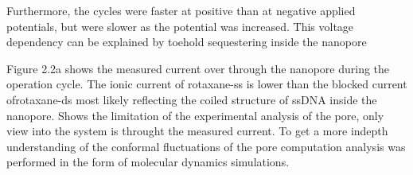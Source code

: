 Furthermore, the cycles were faster at positive than at negative applied potentials, but
were slower as the potential was increased. This voltage dependency can be explained by
toehold sequestering inside the nanopore


Figure 2.2a shows the measured current over through the nanopore during the operation
cycle. The ionic current of rotaxane-ss is lower than the blocked current ofrotaxane-ds
most likely reflecting the coiled structure of ssDNA inside the nanopore. Shows the
limitation of the experimental analysis of the pore, only view into the system is
throught the measured current. To get a more indepth understanding of the conformal
fluctuations of the pore computation analysis was performed in the form of molecular
dynamics simulations.





